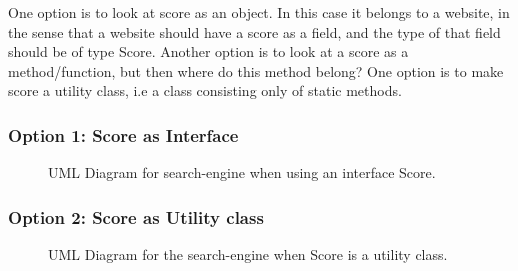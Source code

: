 One option is to look at score as an object. In this case it belongs to a website, in the sense that a website should have a score as a field, and the type of that field should be of type Score.
Another option is to look at a score as a method/function, but then where do this method belong? One option is to make score a utility class, i.e a class consisting only of static methods. 

\subsubsection{Option 1: Score as Interface}
\begin{figure}[t]
	\centering
	\caption{UML Diagram for search-engine when using an interface Score.}
	\label{fig:uml:score-as-interface}
\end{figure}

\subsubsection{Option 2: Score as Utility class}
\begin{figure}[t]
	\centering
	\caption{UML Diagram for the search-engine when Score is a utility class.}
	\label{fig:uml:score-as-utility}
\end{figure}




